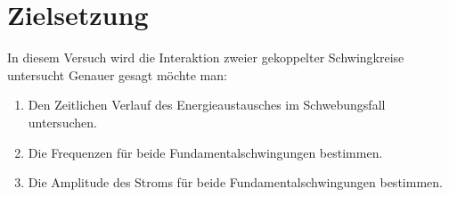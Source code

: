 \section{Zielsetzung}
\label{sec:Zielsetzung}

In diesem Versuch wird die Interaktion zweier gekoppelter Schwingkreise untersucht 
Genauer gesagt möchte man:
\begin{enumerate}[label=\alph*)]
    \item Den Zeitlichen Verlauf des Energieaustausches im Schwebungsfall untersuchen.
    \item Die Frequenzen für beide Fundamentalschwingungen bestimmen.
    \item Die Amplitude des Stroms für beide Fundamentalschwingungen bestimmen.
\end{enumerate}